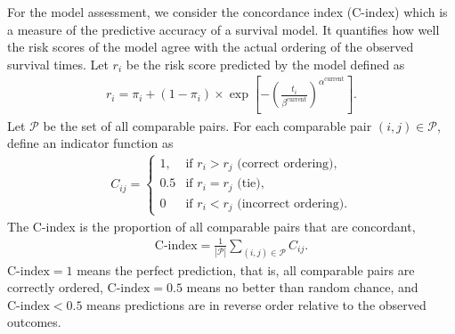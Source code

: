 \documentclass[12pt]{article}
\begin{document}
For the model assessment, we consider the concordance index (C-index) which is a measure of the predictive accuracy of a survival model.
It quantifies how well the risk scores of the model agree with the actual ordering of the observed survival times.
Let $r_i$ be the risk score predicted by the model defined as
\begin{align*}
    r_i = \pi_i + (1 - \pi_i) \times \exp\left[-\left(\frac{t_i}{\beta^{\text{current}}}\right)^{\alpha^{\text{current}}}\right].
\end{align*}
Let $\mathcal{P}$ be the set of all comparable pairs.
For each comparable pair $(i, j) \in \mathcal{P}$, define an indicator function as
\begin{align*}
    C_{ij} = \begin{cases}
    1, & \text{if $r_i > r_j$ (correct ordering)}, \\
    0.5 & \text{if $r_i = r_j$ (tie)}, \\
    0 & \text{if $r_i < r_j$ (incorrect ordering)}.
    \end{cases}
\end{align*}
The C-index is the proportion of all comparable pairs that are concordant,
\begin{align*}
    \text{C-index} = \frac{1}{|\mathcal{P}|}\sum_{(i, j) \in \mathcal{P}} C_{ij}.
\end{align*}
$\text{C-index} = 1$ means the perfect prediction, that is, all comparable pairs are correctly ordered, $\text{C-index} = 0.5$ means no better than random chance, and $\text{C-index} < 0.5$ means predictions are in reverse order relative to the observed outcomes.
\end{document}
